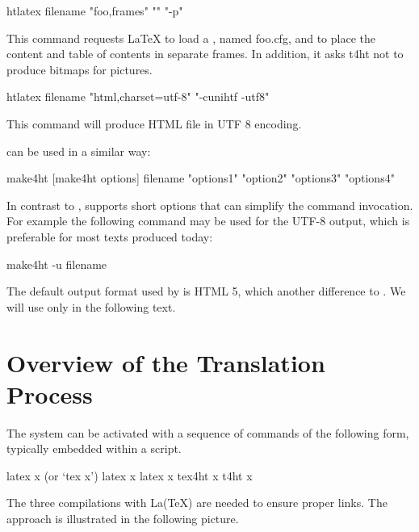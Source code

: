 \begin{shellcommand}
htlatex filename "foo,frames" "" "-p"
\end{shellcommand}

This command requests LaTeX to load a , named
foo.cfg, and to place the content and table of contents in separate frames. In
addition, it asks t4ht not to produce bitmaps for pictures. 

\begin{shellcommand}
htlatex filename "html,charset=utf-8" "-cunihtf -utf8"
\end{shellcommand}

This command will produce HTML file in UTF 8 encoding. 


 can be used in a similar way:

\begin{shellcommand}
make4ht [make4ht options] filename "options1" "option2" "options3" "options4"
\end{shellcommand}

In contrast to ,  supports short options
that can simplify the command invocation. For example the following command may
be used for the UTF-8 output, which is preferable for most texts produced
today:

\begin{shellcommand}
make4ht -u filename
\end{shellcommand}

The default output format used by  is HTML 5, which another
difference to . We will use only  in the
following text.


\section{Overview of the Translation Process}\label{sec:overview}



The system can be activated with a sequence of commands of the following form, typically embedded within a script.

\begin{shellcommand}
latex      x            (or ‘tex x’) 
latex      x 
latex      x 
tex4ht     x 
t4ht       x 
\end{shellcommand}

The three compilations with La(TeX) are needed to ensure proper links. The approach is illustrated in the following picture. 

